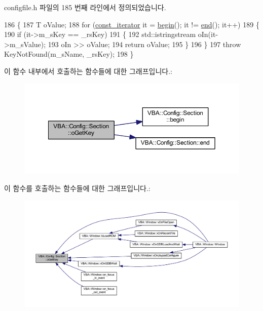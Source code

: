 configfile.\+h 파일의 185 번째 라인에서 정의되었습니다.


\begin{DoxyCode}
186 \{
187   T oValue;
188   \textcolor{keywordflow}{for} (\mbox{\hyperlink{class_v_b_a_1_1_config_1_1_section_a79d4303068448425b08175c0d2dacfab}{const\_iterator}} it = \mbox{\hyperlink{class_v_b_a_1_1_config_1_1_section_ac345183b43a45fd3eeaa646eac631390}{begin}}(); it != \mbox{\hyperlink{class_v_b_a_1_1_config_1_1_section_a15ff15ecb9f7f3aa0bb1c218d47f8829}{end}}(); it++)
189   \{
190     \textcolor{keywordflow}{if} (it->m\_sKey == \_rsKey)
191     \{
192       std::istringstream oIn(it->m\_sValue);
193       oIn >> oValue;
194       \textcolor{keywordflow}{return} oValue;
195     \}
196   \}
197   \textcolor{keywordflow}{throw} KeyNotFound(m\_sName, \_rsKey);
198 \}
\end{DoxyCode}
이 함수 내부에서 호출하는 함수들에 대한 그래프입니다.\+:
\nopagebreak
\begin{figure}[H]
\begin{center}
\leavevmode
\includegraphics[width=350pt]{class_v_b_a_1_1_config_1_1_section_ab169d7aae4e9dde91418ba1668e3ad39_cgraph}
\end{center}
\end{figure}
이 함수를 호출하는 함수들에 대한 그래프입니다.\+:
\nopagebreak
\begin{figure}[H]
\begin{center}
\leavevmode
\includegraphics[width=350pt]{class_v_b_a_1_1_config_1_1_section_ab169d7aae4e9dde91418ba1668e3ad39_icgraph}
\end{center}
\end{figure}
\mbox{\label{class_v_b_a_1_1_config_1_1_section_a7ac9dfabf38bc1db83a6017e130f04ac}} 
